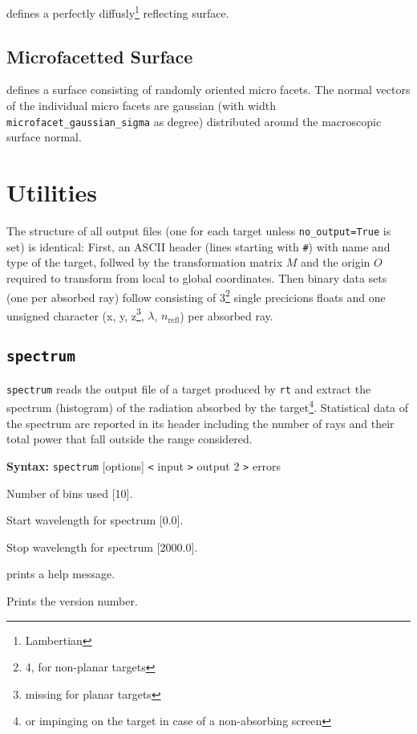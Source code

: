 \documentclass[10pt,a4paper,titlepage]{article}
\newcommand{\rt}{{\tt rt} }
\begin{document}
 defines a perfectly diffusly\footnote{Lambertian} reflecting surface.

\subsection{Microfacetted Surface}

 defines a surface consisting of randomly oriented micro facets. The normal vectors of the individual micro facets are gaussian (with width {\tt microfacet\_gaussian\_sigma} as degree) distributed around the macroscopic surface normal.



\section{Utilities}

The structure of all output files (one for each target unless {\tt no\_output=True} is set) is identical: First, an ASCII header (lines starting with {\tt \#}) with name and type of the target, follwed by the transformation matrix $M$ and the origin $O$ required to transform from local to global coordinates. Then binary data sets (one per absorbed ray) follow consisting of 3\footnote{4, for non-planar targets} single precicions floats and one unsigned character (x, y, z\footnote{missing for planar targets}, $\lambda$, $n_{\mathrm{refl}}$) per absorbed ray.   

\subsection{{\tt spectrum}}

{\tt spectrum} reads the output file of a target produced by \rt and extract the spectrum (histogram) of the radiation absorbed by the target\footnote{or impinging on the target in case of a non-absorbing screen}. Statistical data of the spectrum are reported in its header including the number of rays and their total power that fall outside the range considered.

{\bf Syntax:} {\tt spectrum} [options] {\tt <} input {\tt >} output 2 {\tt >} errors
\vspace{1em}
\begin{list}{}
{\setlength{\leftmargin}{3.5cm}
\setlength{\labelwidth}{3.0cm}
\setlength{\labelsep}{0.25cm}
\setlength{\rightmargin}{0.5cm}}

\item[{\tt [--num|-n]}] Number of bins used [10].
\item[{\tt [--start|-a]}] Start wavelength for spectrum [0.0].
\item[{\tt [--stop|-o]}] Stop wavelength for spectrum [2000.0].
\item[{\tt [--help|-h]}] prints a help message.
\item[{\tt [--Version|-V]}] Prints the version number.

\end{list}
\end{document}
